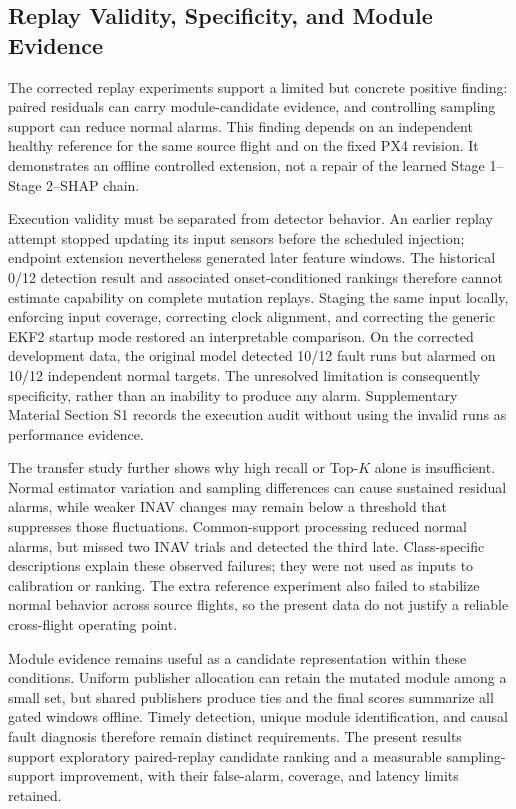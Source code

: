 \subsection{Replay Validity, Specificity, and Module Evidence}

The corrected replay experiments support a limited but concrete positive finding: paired residuals can carry module-candidate evidence, and controlling sampling support can reduce normal alarms. This finding depends on an independent healthy reference for the same source flight and on the fixed PX4 revision. It demonstrates an offline controlled extension, not a repair of the learned Stage 1--Stage 2--SHAP chain.

Execution validity must be separated from detector behavior. An earlier replay attempt stopped updating its input sensors before the scheduled injection; endpoint extension nevertheless generated later feature windows. The historical 0/12 detection result and associated onset-conditioned rankings therefore cannot estimate capability on complete mutation replays. Staging the same input locally, enforcing input coverage, correcting clock alignment, and correcting the generic EKF2 startup mode restored an interpretable comparison. On the corrected development data, the original model detected 10/12 fault runs but alarmed on 10/12 independent normal targets. The unresolved limitation is consequently specificity, rather than an inability to produce any alarm. Supplementary Material Section S1 records the execution audit without using the invalid runs as performance evidence.

The transfer study further shows why high recall or Top-$K$ alone is insufficient. Normal estimator variation and sampling differences can cause sustained residual alarms, while weaker INAV changes may remain below a threshold that suppresses those fluctuations. Common-support processing reduced normal alarms, but missed two INAV trials and detected the third late. Class-specific descriptions explain these observed failures; they were not used as inputs to calibration or ranking. The extra reference experiment also failed to stabilize normal behavior across source flights, so the present data do not justify a reliable cross-flight operating point.

Module evidence remains useful as a candidate representation within these conditions. Uniform publisher allocation can retain the mutated module among a small set, but shared publishers produce ties and the final scores summarize all gated windows offline. Timely detection, unique module identification, and causal fault diagnosis therefore remain distinct requirements. The present results support exploratory paired-replay candidate ranking and a measurable sampling-support improvement, with their false-alarm, coverage, and latency limits retained.
